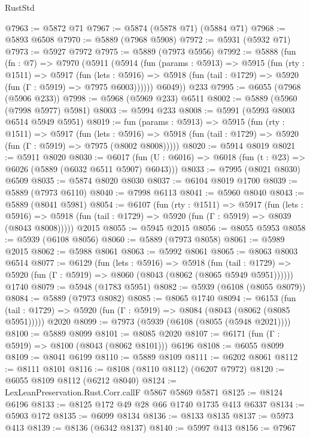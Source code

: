 \begin{lexlean}{RustStd}
\begin{coremodule}
@7963 := @5872 @71
@7967 := @5874 (@5878 @71) (@5884 @71)
@7968 := @5893 @6508
@7970 := @5889 (@7968 @5908)
@7972 := @5931 (@5932 @71)
@7973 := @5927 @7972
@7975 := @5889 (@7973 @5956)
@7992 := @5888
    (fun (fn : @7) =>
    @7970
      (@5911
        (@5914
          (fun (params : @5913) =>
          @5915
            (fun (rty : @1511) =>
            @5917
              (fun (lets : @5916) =>
              @5918 (fun (tail : @1729) => @5920 (fun (Γ : @5919) => @7975 @6003))))))
        @6049))
    @233
@7995 := @6055 (@7968 (@5906 @233))
@7998 := @5968 (@5969 @233) @6511
@8002 := @5889 (@5960 (@7998 @5977) @5981)
@8003 := @5994 @233
@8008 := @5991 (@5993 @8003 @6514 @5949 @5951)
@8019 := fun (params : @5913) =>
  @5915
    (fun (rty : @1511) =>
    @5917
      (fun (lets : @5916) =>
      @5918 (fun (tail : @1729) => @5920 (fun (Γ : @5919) => @7975 (@8002 @8008)))))
@8020 := @5914 @8019
@8021 := @5911 @8020
@8030 := @6017 (fun (U : @6016) => @6018 (fun (t : @23) => @6026 (@5889 (@6032 @6511 @5907) @6043)))
@8033 := @7995 (@8021 @8030) @6509
@8035 := @5874 @8020 @8030
@8037 := @6104 @8019 @1700
@8039 := @5889 (@7973 @6110)
@8040 := @7998 @6113
@8041 := @5960 @8040
@8043 := @5889 (@8041 @5981)
@8054 := @6107
    (fun (rty : @1511) =>
    @5917
      (fun (lets : @5916) =>
      @5918 (fun (tail : @1729) => @5920 (fun (Γ : @5919) => @8039 (@8043 @8008)))))
    @2015
@8055 := @5945 @2015
@8056 := @8055 @5953
@8058 := @5939 (@6108 @8056)
@8060 := @5889 (@7973 @8058)
@8061 := @5989 @2015
@8062 := @5988 @8061
@8063 := @5992 @8061
@8065 := @8063 @8003 @6514
@8077 := @6129
    (fun (lets : @5916) =>
    @5918
      (fun (tail : @1729) => @5920 (fun (Γ : @5919) => @8060 (@8043 (@8062 (@8065 @5949 @5951))))))
    @1740
@8079 := @5948 (@1783 @5951)
@8082 := @5939 (@6108 (@8055 @8079))
@8084 := @5889 (@7973 @8082)
@8085 := @8065 @1740
@8094 := @6153
    (fun (tail : @1729) => @5920 (fun (Γ : @5919) => @8084 (@8043 (@8062 (@8085 @5951)))))
    @2020
@8099 := @7973 (@5939 (@6108 (@8055 (@5948 @2021))))
@8100 := @5889 @8099
@8101 := @8085 @2020
@8107 := @6171 (fun (Γ : @5919) => @8100 (@8043 (@8062 @8101))) @6196
@8108 := @6055 @8099
@8109 := @8041 @6199
@8110 := @5889 @8109
@8111 := @6202 @8061
@8112 := @8111 @8101
@8116 := @8108 (@8110 @8112) (@6207 @7972)
@8120 := @6055 @8109 @8112 (@6212 @8040)
@8124 := LexLeanPreservation.Rust.Corr.callF @5867 @5869 @5871
@8125 := @8124 @6196
@8133 := @8125 @172 @49 @28 @66 @1740 @1735 @413 @6337
@8134 := @5903 @172
@8135 := @6099 @8134
@8136 := @8133 @8135
@8137 := @5973 @413
@8139 := @8136 (@6342 @8137)
@8140 := @5997 @413
@8156 := @7967

\end{coremodule}
\end{lexlean}
